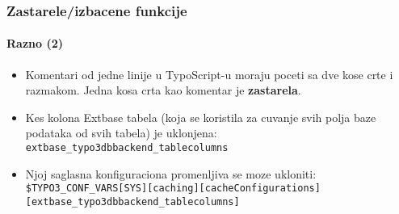 
\begin{frame}[fragile]
	\frametitle{Zastarele/izbacene funkcije}
	\framesubtitle{Razno (2)}

	\begin{itemize}

		\item Komentari od jedne linije u TypoScript-u moraju poceti sa dve kose crte i razmakom. 
			Jedna kosa crta kao komentar je \textbf{zastarela}.

		\item Kes kolona Extbase tabela (koja se koristila za cuvanje svih polja baze podataka od svih tabela)
			je uklonjena:\newline
			\texttt{extbase\_typo3dbbackend\_tablecolumns}

		\item Njoj saglasna konfiguraciona promenljiva se moze ukloniti:
			\smaller
				\texttt{\$TYPO3\_CONF\_VARS[SYS][caching][cacheConfigurations]}\newline
				\tabto{0.4cm}\texttt{[extbase\_typo3dbbackend\_tablecolumns]}
			\normalsize

	\end{itemize}

\end{frame}

